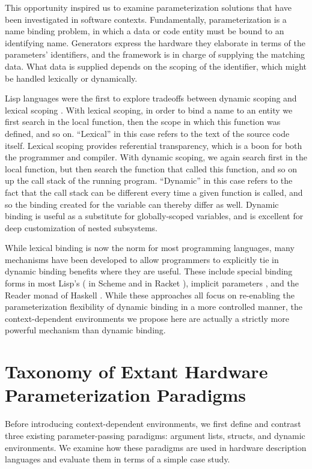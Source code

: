 This opportunity inspired us to examine parameterization solutions that have been investigated in software contexts.
Fundamentally, parameterization is a name binding problem, in which a data or code entity must be bound to an identifying name.
Generators express the hardware they elaborate in terms of the parameters' identifiers, and the framework is in charge of supplying the matching data.
What data is supplied depends on the scoping of the identifier, which might be handled lexically or dynamically.

Lisp languages were the first to explore tradeoffs between dynamic scoping and lexical scoping \cite{gordon}.
With lexical scoping, in order to bind a name to an entity we first search in the local function, then the scope in which this function was defined, and so on.
``Lexical'' in this case refers to the text of the source code itself.
Lexical scoping provides referential transparency, which is a boon for both the programmer and compiler.
With dynamic scoping, we again search first in the local function, but then search the function that called this function, and so on up the call stack of the running program.
``Dynamic'' in this case refers to the fact that the call stack can be different every time a given function is called, and so the binding created for the variable can thereby differ as well.
Dynamic binding is useful as a substitute for globally-scoped variables, and is excellent for deep customization of nested subsystems.

While lexical binding is now the norm for most programming languages, many mechanisms have been developed to allow programmers to explicitly tie in dynamic binding benefits where they are useful.
These include special binding forms in most Lisp's ( in Scheme \cite{steele} and  in Racket \cite{flatt2013racket}), implicit parameters \cite{lewis2000implicit}, and the Reader monad of Haskell \cite{jones1995functional}.
While these approaches all focus on re-enabling the parameterization flexibility of dynamic binding in a more controlled manner, 
the context-dependent environments we propose here are actually a strictly more powerful mechanism than dynamic binding. 

\section{Taxonomy of Extant Hardware Parameterization Paradigms}
\label{sec:tax}

Before introducing context-dependent environments, we first define and contrast three existing parameter-passing paradigms: argument lists, structs, and dynamic environments.
We examine how these paradigms are used in hardware description languages and evaluate them in terms of a simple case study.

